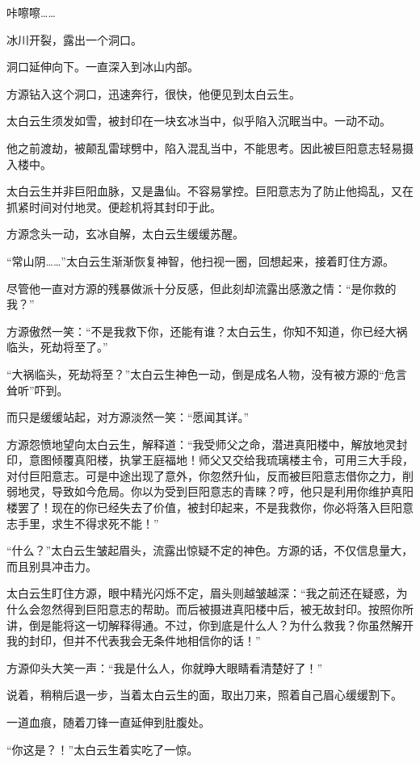 \begin{this_body}
咔嚓嚓……

冰川开裂，露出一个洞口。

洞口延伸向下。一直深入到冰山内部。

方源钻入这个洞口，迅速奔行，很快，他便见到太白云生。

太白云生须发如雪，被封印在一块玄冰当中，似乎陷入沉眠当中。一动不动。

他之前渡劫，被颠乱雷球劈中，陷入混乱当中，不能思考。因此被巨阳意志轻易摄入楼中。

太白云生并非巨阳血脉，又是蛊仙。不容易掌控。巨阳意志为了防止他捣乱，又在抓紧时间对付地灵。便趁机将其封印于此。

方源念头一动，玄冰自解，太白云生缓缓苏醒。

“常山阴……”太白云生渐渐恢复神智，他扫视一圈，回想起来，接着盯住方源。

尽管他一直对方源的残暴做派十分反感，但此刻却流露出感激之情：“是你救的我？”

方源傲然一笑：“不是我救下你，还能有谁？太白云生，你知不知道，你已经大祸临头，死劫将至了。”

“大祸临头，死劫将至？”太白云生神色一动，倒是成名人物，没有被方源的“危言耸听”吓到。

而只是缓缓站起，对方源淡然一笑：“愿闻其详。”

方源怨愤地望向太白云生，解释道：“我受师父之命，潜进真阳楼中，解放地灵封印，意图倾覆真阳楼，执掌王庭福地！师父又交给我琉璃楼主令，可用三大手段，对付巨阳意志。可是中途出现了意外，你忽然升仙，反而被巨阳意志借你之力，削弱地灵，导致如今危局。你以为受到巨阳意志的青睐？哼，他只是利用你维护真阳楼罢了！现在的你已经失去了价值，被封印起来，不是我救你，你必将落入巨阳意志手里，求生不得求死不能！”

“什么？”太白云生皱起眉头，流露出惊疑不定的神色。方源的话，不仅信息量大，而且别具冲击力。

太白云生盯住方源，眼中精光闪烁不定，眉头则越皱越深：“我之前还在疑惑，为什么会忽然得到巨阳意志的帮助。而后被摄进真阳楼中后，被无故封印。按照你所讲，倒是能将这一切解释得通。不过，你到底是什么人？为什么救我？你虽然解开我的封印，但并不代表我会无条件地相信你的话！”

方源仰头大笑一声：“我是什么人，你就睁大眼睛看清楚好了！”

说着，稍稍后退一步，当着太白云生的面，取出刀来，照着自己眉心缓缓割下。

一道血痕，随着刀锋一直延伸到肚腹处。

“你这是？！”太白云生着实吃了一惊。


\end{this_body}
